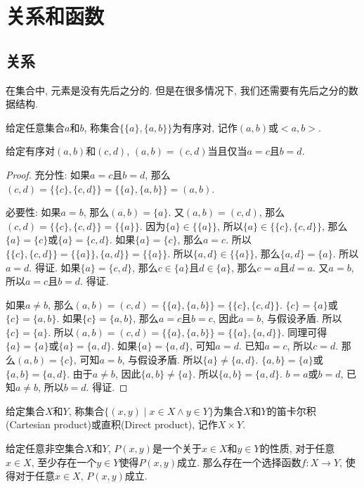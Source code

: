 \chapter{关系和函数}
\section{关系}

在集合中, 元素是没有先后之分的. 但是在很多情况下, 我们还需要有先后之分的数据结构. 
\begin{definition}[有序对]
	给定任意集合$a$和$b$, 称集合$\{\{a\},\{a,b\}\}$为有序对, 记作$(a, b)$或$<a,b>$.
\end{definition}

\begin{proposition}
	给定有序对$(a,b)$和$(c,d)$, $(a,b)=(c,d)$当且仅当$a=c$且$b=d$.
\end{proposition}

\begin{proof}
	充分性: 如果$a=c$且$b=d$, 那么$(c,d)=\{\{c\},\{c,d\}\}=\{\{a\},\{a,b\}\}=(a,b)$.

	必要性: 如果$a=b$, 那么$(a,b)=\{a\}$. 又$(a,b)=(c,d)$, 那么$(c,d)=\{\{c\},\{c,d\}\}=\{\{a\}\}$. 因为$\{a\}\in \{\{a\}\}$, 所以$\{a\}\in \{\{c\}, \{c,d\}\}$, 那么$\{a\}=\{c\}$或$\{a\}=\{c,d\}$. 如果$\{a\}=\{c\}$, 那么$a=c$. 所以$\{\{c\}, \{c,d\}\}=\{\{a\}\},\{a,d\}\}=\{\{a\}\}$. 所以$\{a,d\}\in \{\{a\}\}$, 那么$\{a,d\}=\{a\}$. 所以$a=d$. 得证. 如果$\{a\}=\{c,d\}$, 那么$c\in \{a\}$且$d\in \{a\}$, 那么$c=a$且$d=a$. 又$a=b$, 所以$a=c$且$b=d$. 得证.

	如果$a\neq b$, 那么$(a,b)=(c,d)=\{\{a\},\{a,b\}\}=\{\{c\},\{c,d\}\}$. $\{c\}=\{a\}$或$\{c\}=\{a,b\}$. 如果$\{c\}=\{a,b\}$, 那么$a=c$且$b=c$, 因此$a=b$, 与假设矛盾. 所以$\{c\}=\{a\}$. 所以$(a,b)=(c,d)=\{\{a\},\{a,b\}\}=\{\{a\},\{a,d\}\}$. 同理可得$\{a\}=\{a\}$或$\{a\}=\{a,d\}$. 如果$\{a\}=\{a,d\}$, 可知$a=d$. 已知$a=c$, 所以$c=d$. 那么$(a,b)=\{c\}$, 可知$a=b$, 与假设矛盾. 所以$\{a\}\neq\{a,d\}$. $\{a,b\}=\{a\}$或$\{a,b\}=\{a,d\}$. 由于$a\neq b$, 因此$\{a,b\}\neq\{a\}$. 所以$\{a,b\}=\{a,d\}$. $b=a$或$b=d$, 已知$a\neq b$, 所以$b=d$. 得证.
\end{proof}

\begin{definition}[笛卡尔积]
	给定集合$X$和$Y$, 称集合$\{(x,y)\mid x\in X\wedge y\in Y\}$为集合$X$和$Y$的笛卡尔积(Cartesian product)或直积(Direct product), 记作$X\times Y$.
\end{definition}

\begin{proposition}
	给定任意非空集合$X$和$Y$, $P(x,y)$是一个关于$x\in X$和$y\in Y$的性质, 对于任意$x\in X$, 至少存在一个$y\in Y$使得$P(x,y)$成立. 那么存在一个选择函数$f\colon X\rightarrow Y$, 使得对于任意$x\in X$, $P(x,y)$成立.
\end{proposition}

